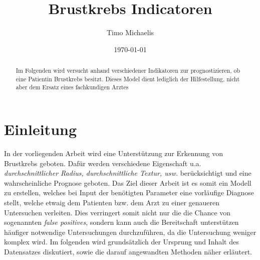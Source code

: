 \documentclass[a4paper,12pt]{article}
\title{Brustkrebs Indicatoren}
\author{Timo Michaelis}
\date{\today}
\begin{document}
\maketitle

\begin{abstract}
Im Folgenden wird versucht anhand verschiedener Indikatoren zur prognostizieren, ob eine Patientin Brustkrebs besitzt.
    Dieses Model dient lediglich der Hilfestellung, nicht aber dem Ersatz eines fachkundigen Arztes
\end{abstract}

\tableofcontents %

\newpage

\section{Einleitung}
In der vorliegenden Arbeit wird eine Unterstützung zur Erkennung von Brustkrebs geboten. Dafür werden verschiedene Eigenschaft
u.a. \textit{durchschnittlicher Radius, durchschnittliche Textur, usw.} berücksichtigt und eine wahrscheinliche Prognose geboten.\newline
Das Ziel dieser Arbeit ist es somit ein Modell zu erstellen, welches bei Input der benötigten Parameter eine vorläufige Diagnose stellt,
welche etwaig dem Patienten bzw. dem Arzt zu einer genaueren Untersuchen verleiten. Dies verringert somit nicht nur die die Chance von
sogenannten \textit{false positives}, sondern kann auch die Bereitschaft unterstützen häufiger notwendige Untersuchungen
durchzuführen, da die Untersuchung weniger komplex wird.\newline
Im folgenden wird grundsätzlich der Ursprung und Inhalt des Datensatzes diskutiert, sowie die darauf angewandten Methoden näher erläutert.
\end{document}
